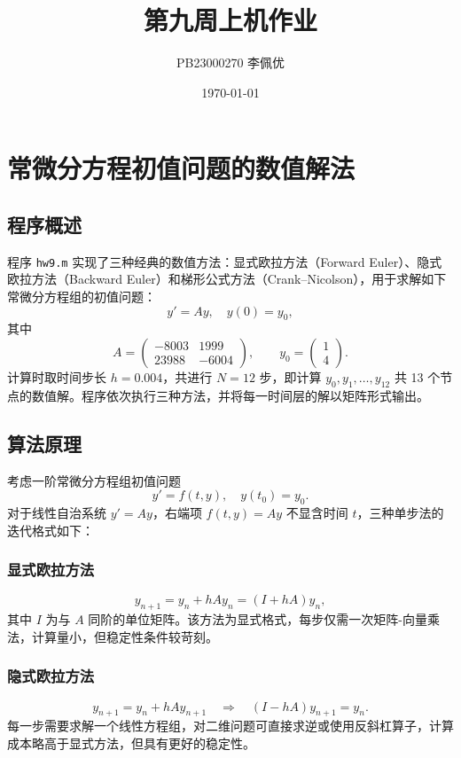 \documentclass[12pt,a4paper]{article}
\title{第九周上机作业}
\author{PB23000270 李佩优}
\date{\today}
\begin{document}
\maketitle

\section{常微分方程初值问题的数值解法}

\subsection{程序概述}

程序 \texttt{hw9.m} 实现了三种经典的数值方法：显式欧拉方法（Forward Euler）、隐式欧拉方法（Backward Euler）和梯形公式方法（Crank–Nicolson），用于求解如下常微分方程组的初值问题：
\[
y' = Ay, \quad y(0) = y_0,
\]
其中
\[
A = \begin{pmatrix} -8003 & 1999 \\ 23988 & -6004 \end{pmatrix}, \qquad
y_0 = \begin{pmatrix} 1 \\ 4 \end{pmatrix}.
\]
计算时取时间步长 \(h = 0.004\)，共进行 \(N = 12\) 步，即计算 \(y_0, y_1, \dots, y_{12}\) 共 13 个节点的数值解。程序依次执行三种方法，并将每一时间层的解以矩阵形式输出。

\subsection{算法原理}

考虑一阶常微分方程组初值问题
\[
y' = f(t, y), \quad y(t_0) = y_0.
\]
对于线性自治系统 \(y' = Ay\)，右端项 \(f(t,y) = Ay\) 不显含时间 \(t\)，三种单步法的迭代格式如下：

\subsubsection{显式欧拉方法}
\[
y_{n+1} = y_n + h A y_n = (I + hA) y_n,
\]
其中 \(I\) 为与 \(A\) 同阶的单位矩阵。该方法为显式格式，每步仅需一次矩阵-向量乘法，计算量小，但稳定性条件较苛刻。

\subsubsection{隐式欧拉方法}
\[
y_{n+1} = y_n + h A y_{n+1} \quad \Longrightarrow \quad (I - hA) y_{n+1} = y_n.
\]
每一步需要求解一个线性方程组，对二维问题可直接求逆或使用反斜杠算子，计算成本略高于显式方法，但具有更好的稳定性。
\end{document}
